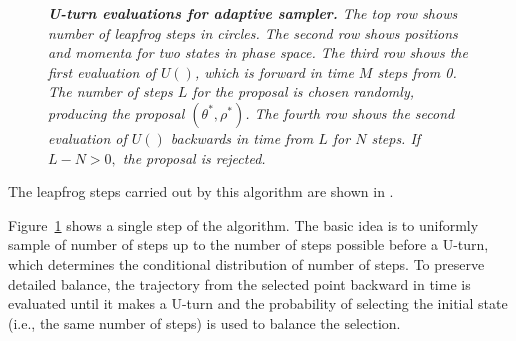 \documentclass[ejs]{imsart}
\theoremstyle{plain}%
\theoremstyle{remark}
\begin{document}
\begin{figure}
    \centering
{}
    \caption{\it {\bfseries U-turn evaluations for adaptive sampler.} The top row shows number of leapfrog steps in circles.  The second row shows positions and momenta for two states in phase space.  The third row shows the first evaluation of $U()$, which is forward in time $M$ steps from 0.  The number of steps $L$ for the proposal is chosen randomly, producing the proposal $(\theta^*, \rho^*)$.  The fourth row shows the second evaluation of $U()$ backwards in time from $L$ for $N$ steps.  If $L - N > 0,$ the proposal is rejected.}
    \label{fig:adaptive-u-turns}
\end{figure}

The leapfrog steps carried out by this algorithm are shown in .  

Figure~\ref{fig:adaptive-u-turns} shows a single step of the algorithm.  The basic idea is to uniformly sample of number of steps up to the number of steps possible before a U-turn, which determines the conditional distribution of number of steps.  To preserve detailed balance, the trajectory from the selected point backward in time is evaluated until it makes a U-turn and the probability of selecting the initial state (i.e., the same number of steps) is used to balance the selection.  
\end{document}
